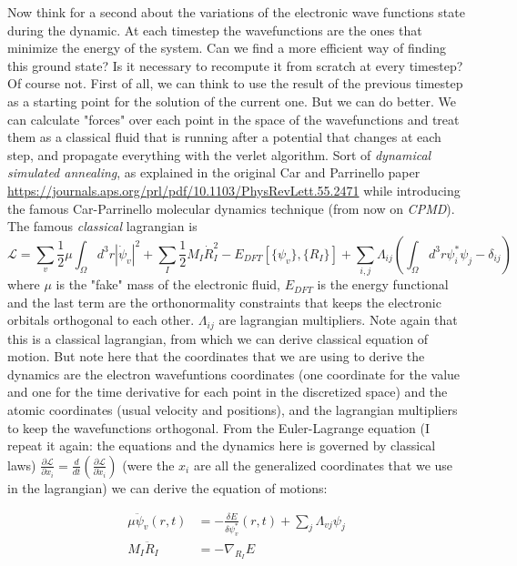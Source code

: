 \documentclass{article}
\begin{document}
Now think for a second about the variations of the electronic wave functions state during the dynamic. At each timestep the wavefunctions are the ones that minimize the energy of the system. Can we find a more efficient way of finding this ground state? Is it necessary to recompute it from scratch at every timestep? Of course not. First of all, we can think to use the result of the previous timestep as a starting point for the solution of the current one. But we can do better. We can calculate "forces" over each point in the space of the wavefunctions and treat them as a classical fluid that is running after a potential that changes at each step, and propagate everything with the verlet algorithm. Sort of \emph{dynamical simulated annealing}, as explained in the original Car and Parrinello paper \url{https://journals.aps.org/prl/pdf/10.1103/PhysRevLett.55.2471} while introducing the famous Car-Parrinello molecular dynamics technique (from now on \emph{CPMD}). The famous \emph{classical} lagrangian is
\begin{equation}
    \mathcal{L}=\sum_v\frac{1}{2}\mu\int_{\Omega}d^3r|\dot\psi_v|^2+\sum_I\frac{1}{2}M_I\dot R_I^2-E_{DFT}[\{\psi_v\},\{R_I\}] + \sum_{i,j}\Lambda_{ij}\left(\int_{\Omega}d^3r\psi_i^*\psi_j-\delta_{ij}\right)
\end{equation}
where $\mu$ is the "fake" mass of the electronic fluid, $E_{DFT}$ is the energy functional and the last term are the orthonormality constraints that keeps the electronic orbitals orthogonal to each other. $\Lambda_{ij}$ are lagrangian multipliers. Note again that this is a classical lagrangian, from which we can derive classical equation of motion. But note here that the coordinates that we are using to derive the dynamics are the electron wavefuntions coordinates (one coordinate for the value and one for the time derivative for each point in the discretized space) and the atomic coordinates (usual velocity and positions), and the lagrangian multipliers to keep the wavefunctions orthogonal. From the Euler-Lagrange equation (I repeat it again: the equations and the dynamics here is governed by classical laws) $\frac{\partial\mathcal{L}}{\partial{x_i}}=\frac{d}{dt}(\frac{\partial\mathcal{L}}{\partial{\dot x_i}})$ (were the $x_i$ are all the generalized coordinates that we use in the lagrangian) we can derive the equation of motions:

\begin{align}
    \mu\ddot\psi_v(r,t)&=-\frac{\delta E}{\delta\psi_v^*}(r,t)+\sum_{j}\Lambda_{vj}\psi_j \\
    M_I\ddot R_I &= - \nabla_{R_I} E
\end{align}
\end{document}
